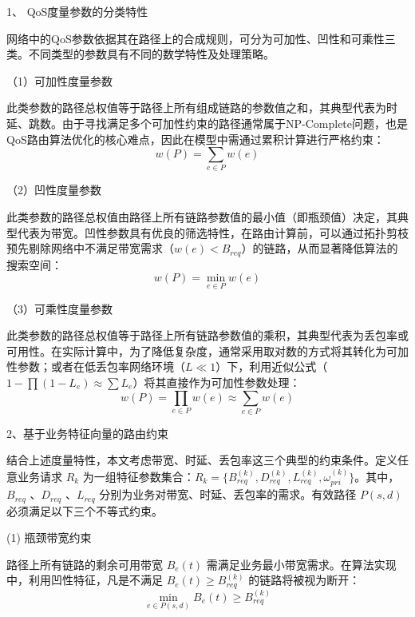 \documentclass[print, master, vlined]{DissertUESTC}
\begin{document}
    1、 QoS度量参数的分类特性
    
    网络中的QoS参数依据其在路径上的合成规则，可分为可加性、凹性和可乘性三类。不同类型的参数具有不同的数学特性及处理策略。
    
    （1）可加性度量参数
    
    此类参数的路径总权值等于路径上所有组成链路的参数值之和，其典型代表为时延、跳数。由于寻找满足多个可加性约束的路径通常属于NP-Complete问题，也是QoS路由算法优化的核心难点，因此在模型中需通过累积计算进行严格约束：
    \begin{equation}
        w(P) = \sum_{e \in P} w(e)
    \end{equation}
    
    （2）凹性度量参数
    
    此类参数的路径总权值由路径上所有链路参数值的最小值（即瓶颈值）决定，其典型代表为带宽。凹性参数具有优良的筛选特性，在路由计算前，可以通过拓扑剪枝预先剔除网络中不满足带宽需求（$w(e) < B_{req}$）的链路，从而显著降低算法的搜索空间：
    \begin{equation}
        w(P) = \min_{e \in P} w(e)
    \end{equation}
    
    （3）可乘性度量参数
    
    此类参数的路径总权值等于路径上所有链路参数值的乘积，其典型代表为丢包率或可用性。在实际计算中，为了降低复杂度，通常采用取对数的方式将其转化为可加性参数；或者在低丢包率网络环境（$L \ll 1$）下，利用近似公式（$1-\prod(1-L_e) \approx \sum L_e$）将其直接作为可加性参数处理：
    \begin{equation}
        w(P) = \prod_{e \in P} w(e) \approx \sum_{e \in P} w(e)
    \end{equation}

    2、基于业务特征向量的路由约束
    
    结合上述度量特性，本文考虑带宽、时延、丢包率这三个典型的约束条件。定义任意业务请求 $R_k$ 为一组特征参数集合：$R_k = \{ B_{req}^{(k)}, D_{req}^{(k)}, L_{req}^{(k)}, \omega_{pri}^{(k)} \}$。其中，$B_{req}$ 、$D_{req}$ 、$L_{req}$ 分别为业务对带宽、时延、丢包率的需求。有效路径 $P(s, d)$ 必须满足以下三个不等式约束。
    
    (1) 瓶颈带宽约束
    
    路径上所有链路的剩余可用带宽 $B_e(t)$ 需满足业务最小带宽需求。在算法实现中，利用凹性特征，凡是不满足 $B_e(t) \ge B_{req}^{(k)}$ 的链路将被视为断开：
    \begin{equation}
        \min_{e \in P(s,d)} B_e(t) \ge B_{req}^{(k)}
    \end{equation}
    
\end{document}
